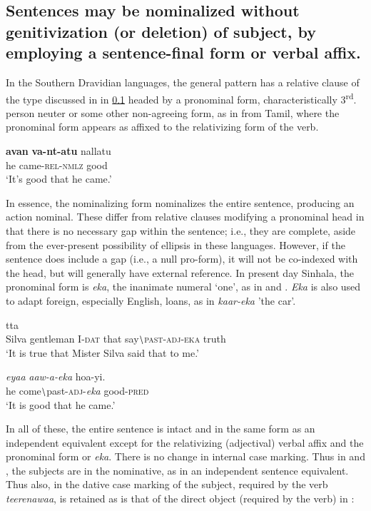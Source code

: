\subsection[Nominalization without genitives]{Sentences may be nominalized without genitivization (or deletion) of subject, by employing a sentence-final form or verbal affix.}\label{gair:sec:3.6}
In the Southern Dravidian languages, the general pattern has a relative clause of the type discussed in in \ref{gair:sec:3.6} headed by a pronominal form, characteristically 3\textsuperscript{rd}. person neuter or some other non-agreeing form, as in  from Tamil, where the pronominal form appears as affixed to the relativizing form of the verb.



\ea\label{ex3.6.1} 
\gll  \textbf{avan} \textbf{va-nt-atu}  nallatu\\
  he  came-\textsc{rel}-\textsc{nmlz} good\\
  `It's good that he came.'
\z


In essence, the nominalizing form nominalizes the entire sentence, producing an action nominal. These differ from relative clauses modifying a pronominal head in that there is no necessary gap within the sentence; i.e., they are complete, aside from the ever-present possibility of ellipsis in these languages. However, if the sentence does include a gap (i.e., a null pro-form), it will not be co-indexed with the head, but will generally have external reference.
In present day Sinhala, the pronominal form is \textit{eka}, the inanimate numeral `one', as in  and . \textit{Eka} is also used to adapt foreign, especially English, loans, as in \textit{kaar-eka} 'the car'.

\ea\label{ex3.6.2} 
tta \\
Silva  gentleman  I-\textsc{dat} that  say$\backslash$\textsc{past}-\textsc{adj}-\textsc{eka} truth\\
    `It is true that Mister Silva said that to me.'
\z

\ea\label{ex3.6.3} 
\gll \textit{eyaa} \textit{aaw-a-eka}  ho{\und}a-yi.\\
  he  come$\backslash$past-\textsc{adj}-\textit{eka}  good-\textsc{pred} \\
  `It is good that he came.'
\z


In all of these, the entire sentence is intact and in the same form as an independent equivalent except for the relativizing (adjectival) verbal affix and the pronominal form or \textit{eka}. There is no change in internal case marking. Thus in  and , the subjects are in the nominative, as in an independent sentence equivalent. Thus also, in  the dative case marking of the subject, required by the verb \textit{teerenawaa}, is retained as is that of the direct object  (required by the verb) in :



